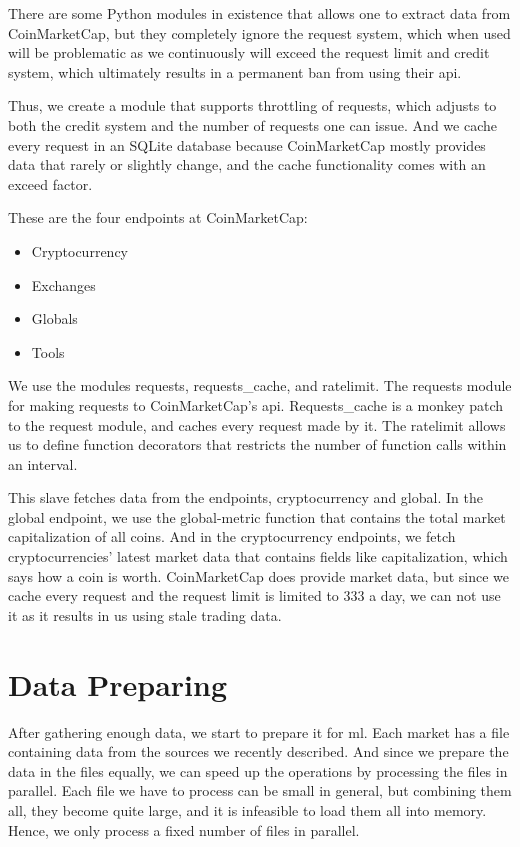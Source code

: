 There are some Python modules in existence that allows one to extract data from CoinMarketCap, but they completely ignore the request system, which when used will be problematic as we continuously will exceed the request limit and credit system, which ultimately results in a permanent ban from using their \ac{api}.

Thus, we create a module that supports throttling of requests, which adjusts to both the credit system and the number of requests one can issue. And we cache every request in an SQLite database because CoinMarketCap mostly provides data that rarely or slightly change, and the cache functionality comes with an exceed factor.

These are the four endpoints at CoinMarketCap:
\begin{itemize}
    \item Cryptocurrency
    \item Exchanges
    \item Globals
    \item Tools
\end{itemize}

We use the modules requests, requests\_cache, and ratelimit. The requests module for making requests to CoinMarketCap's \ac{api}. Requests\_cache is a monkey patch to the request module, and caches every request made by it. The ratelimit allows us to define function decorators that restricts the number of function calls within an interval.

This slave fetches data from the endpoints, cryptocurrency and global. In the global endpoint, we use the global-metric function that contains the total market capitalization of all coins. And in the cryptocurrency endpoints, we fetch cryptocurrencies' latest market data that contains fields like capitalization, which says how a coin is worth. CoinMarketCap does provide market data, but since we cache every request and the request limit is limited to $333$ a day, we can not use it as it results in us using stale trading data.

\section{Data Preparing}
After gathering enough data, we start to prepare it for \ac{ml}. Each market has a file containing data from the sources we recently described. And since we prepare the data in the files equally, we can speed up the operations by processing the files in parallel. Each file we have to process can be small in general, but combining them all, they become quite large, and it is infeasible to load them all into memory. Hence, we only process a fixed number of files in parallel.

